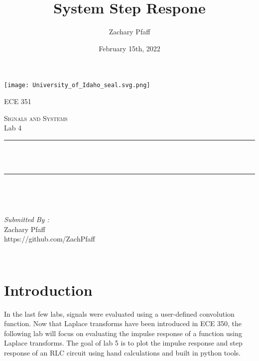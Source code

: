 \documentclass[12pt]{report}
\title{System Step Respone}
\author{Zachary Pfaff}
\date{February 15th, 2022}
\makeatletter
\let\thetitle\@title
\makeatother
\begin{document}
\begin{titlepage}
\centering
\vspace*{0.5 cm}
\texttt{[image: University\_of\_Idaho\_seal.svg.png]}\\
\begin{center}    \textsc{\Large   ECE 351}\\[2.0 cm]
\end{center}%
\textsc{\Large Signals and Systems  }\\[0.5 cm] %
Lab 4
\rule{\linewidth}{0.2 mm} \\[0.4 cm]
{ \huge \bfseries \thetitle}\\
\rule{\linewidth}{0.2 mm} \\[1.5 cm]
\begin{minipage}{0.4\textwidth}
\begin{flushleft} \large
\end{flushleft}
\end{minipage}~
\begin{minipage}{0.4\textwidth}
\begin{flushright} \large
\emph{Submitted By :} \\
Zachary Pfaff\\https://github.com/ZachPfaff
\end{flushright}
\end{minipage}\\[2 cm]
\end{titlepage}
\tableofcontents
\pagebreak
\renewcommand{\thesection}{\arabic{section}}
\setlength{\parindent}{20pt}

\maketitle
\section{Introduction}
\hspace{\parindent}In the last few labs, signals were evaluated using a user-defined convolution function. Now that Laplace transforms have been introduced in ECE 350, the following lab will focus on evaluating the impulse response of a function using Laplace transforms. The goal of lab 5 is to plot the impulse response and step response of an RLC circuit using hand calculations and built in python tools. \par
\end{document}
